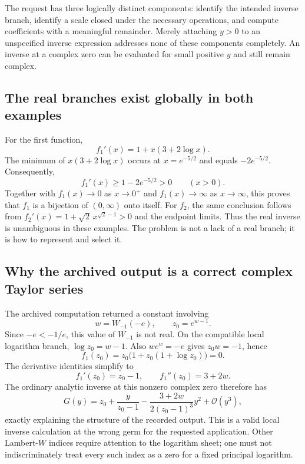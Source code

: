 \documentclass[11pt,a4paper]{article}
\numberwithin{equation}{section}
\theoremstyle{definition}
\theoremstyle{remark}
\newcommand{\OO}{\mathcal O}
\begin{document}
The request has three logically distinct components: identify the intended
inverse branch, identify a scale closed under the necessary operations,
and compute coefficients with a meaningful remainder. Merely attaching
$y>0$ to an unspecified inverse expression addresses none of these
components completely. An inverse at a complex zero can be evaluated for
small positive $y$ and still remain complex.

\subsection{The real branches exist globally in both examples}

For the first function,
\[
 f_1'(x)=1+x(3+2\log x).
\]
The minimum of $x(3+2\log x)$ occurs at $x=e^{-5/2}$ and equals
$-2e^{-5/2}$. Consequently,
\begin{equation}\label{eq:global-slope}
 f_1'(x)\ge 1-2e^{-5/2}>0\qquad(x>0).
\end{equation}
Together with $f_1(x)\to0$ as $x\to0^+$ and $f_1(x)\to\infty$ as
$x\to\infty$, this proves that $f_1$ is a bijection of $(0,\infty)$ onto
itself. For $f_2$, the same conclusion follows from
$f_2'(x)=1+\sqrt2\,x^{\sqrt2-1}>0$ and the endpoint limits.
Thus the real inverse is unambiguous in these examples. The problem is
not a lack of a real branch; it is how to represent and select it.

\subsection{Why the archived output is a correct complex Taylor series}

The archived computation returned a constant involving
\[
 w=W_{-1}(-e),\qquad z_0=e^{w-1}.
\]
Since $-e<-1/e$, this value of $W_{-1}$ is not real. On the compatible local
logarithm branch, $\log z_0=w-1$. Also $we^w=-e$ gives $z_0w=-1$, hence
\[
 f_1(z_0)=z_0\bigl(1+z_0(1+\log z_0)\bigr)=0.
\]
The derivative identities simplify to
\[
 f_1'(z_0)=z_0-1,\qquad f_1''(z_0)=3+2w.
\]
The ordinary analytic inverse at this nonzero complex zero therefore has
\begin{equation}\label{eq:complex-germ}
 G(y)=z_0+\frac{y}{z_0-1}
 -\frac{3+2w}{2(z_0-1)^3}y^2+\OO(y^3),
\end{equation}
exactly explaining the structure of the recorded output. This is a valid
local inverse calculation at the wrong germ for the requested application.
Other Lambert-$W$ indices require attention to the logarithm sheet; one
must not indiscriminately treat every such index as a zero for a fixed
principal logarithm.
\end{document}
